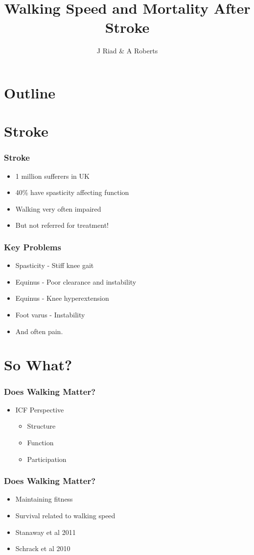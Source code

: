 \documentclass{beamer}
\title{Walking Speed and Mortality After Stroke}
\author{J Riad \& A Roberts}
\institute{Skovde Hospital, Sweden \& RJAH, UK}
\begin{document}

\section*{Outline}
\begin{frame}
\titlepage
\end{frame}
\section{Stroke}
\begin{frame}\frametitle{Stroke}
\begin{itemize}
\item 1 million sufferers in UK
\item 40\% have spasticity affecting function
\item Walking very often impaired
\item But not referred for treatment!
\end{itemize}
\end{frame}
\begin{frame}\frametitle{Key Problems}
\begin{itemize}
\item Spasticity - Stiff knee gait
\item Equinus - Poor clearance and instability
\item Equinus - Knee hyperextension
\item Foot varus - Instability
\item And often pain.
\end{itemize}
\end{frame}

\section{So What?}
\begin{frame}\frametitle{Does Walking Matter?}
\begin{itemize}
\item ICF Perspective
\begin{itemize}
\item Structure
\item Function
\item Participation
\end{itemize}
\end{itemize}
\end{frame}
\begin{frame}\frametitle{Does Walking Matter?}
\begin{itemize}
\item Maintaining fitness
\item Survival related to walking speed
\item Stanaway et al 2011
\item Schrack et al 2010
\end{itemize}
\end{frame}
\end{document}
